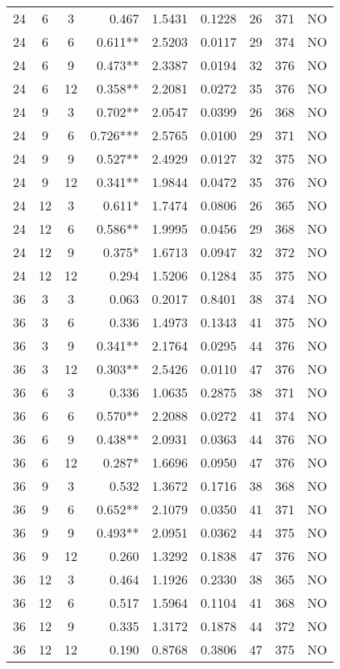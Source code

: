 \begin{table}[htbp]
\begin{tabular}{ccc|rrrcc|c}
24 & 6 & 3 & 0.467 & 1.5431 & 0.1228 & 26 & 371 & NO \\
24 & 6 & 6 & 0.611** & 2.5203 & 0.0117 & 29 & 374 & NO \\
24 & 6 & 9 & 0.473** & 2.3387 & 0.0194 & 32 & 376 & NO \\
24 & 6 & 12 & 0.358** & 2.2081 & 0.0272 & 35 & 376 & NO \\
24 & 9 & 3 & 0.702** & 2.0547 & 0.0399 & 26 & 368 & NO \\
24 & 9 & 6 & 0.726*** & 2.5765 & 0.0100 & 29 & 371 & NO \\
24 & 9 & 9 & 0.527** & 2.4929 & 0.0127 & 32 & 375 & NO \\
24 & 9 & 12 & 0.341** & 1.9844 & 0.0472 & 35 & 376 & NO \\
24 & 12 & 3 & 0.611* & 1.7474 & 0.0806 & 26 & 365 & NO \\
24 & 12 & 6 & 0.586** & 1.9995 & 0.0456 & 29 & 368 & NO \\
24 & 12 & 9 & 0.375* & 1.6713 & 0.0947 & 32 & 372 & NO \\
24 & 12 & 12 & 0.294 & 1.5206 & 0.1284 & 35 & 375 & NO \\
36 & 3 & 3 & 0.063 & 0.2017 & 0.8401 & 38 & 374 & NO \\
36 & 3 & 6 & 0.336 & 1.4973 & 0.1343 & 41 & 375 & NO \\
36 & 3 & 9 & 0.341** & 2.1764 & 0.0295 & 44 & 376 & NO \\
36 & 3 & 12 & 0.303** & 2.5426 & 0.0110 & 47 & 376 & NO \\
36 & 6 & 3 & 0.336 & 1.0635 & 0.2875 & 38 & 371 & NO \\
36 & 6 & 6 & 0.570** & 2.2088 & 0.0272 & 41 & 374 & NO \\
36 & 6 & 9 & 0.438** & 2.0931 & 0.0363 & 44 & 376 & NO \\
36 & 6 & 12 & 0.287* & 1.6696 & 0.0950 & 47 & 376 & NO \\
36 & 9 & 3 & 0.532 & 1.3672 & 0.1716 & 38 & 368 & NO \\
36 & 9 & 6 & 0.652** & 2.1079 & 0.0350 & 41 & 371 & NO \\
36 & 9 & 9 & 0.493** & 2.0951 & 0.0362 & 44 & 375 & NO \\
36 & 9 & 12 & 0.260 & 1.3292 & 0.1838 & 47 & 376 & NO \\
36 & 12 & 3 & 0.464 & 1.1926 & 0.2330 & 38 & 365 & NO \\
36 & 12 & 6 & 0.517 & 1.5964 & 0.1104 & 41 & 368 & NO \\
36 & 12 & 9 & 0.335 & 1.3172 & 0.1878 & 44 & 372 & NO \\
36 & 12 & 12 & 0.190 & 0.8768 & 0.3806 & 47 & 375 & NO \\
\bottomrule
\end{tabular}
\end{table}
